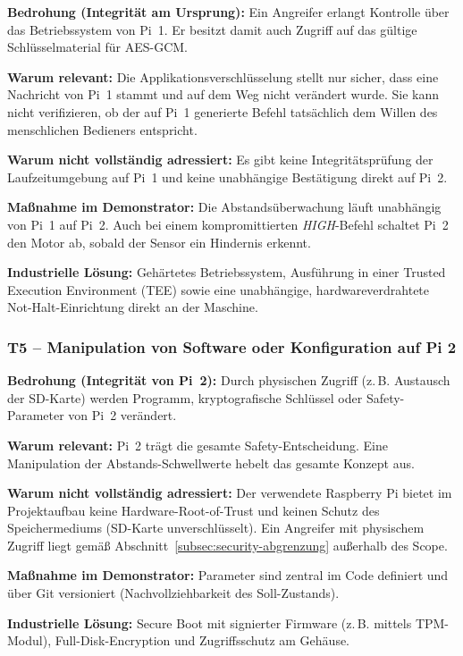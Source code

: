 \textbf{Bedrohung (Integrität am Ursprung):} Ein Angreifer erlangt Kontrolle
über das Betriebssystem von Pi~1. Er besitzt damit auch Zugriff auf das
gültige Schlüsselmaterial für AES-GCM.

\textbf{Warum relevant:} Die Applikationsverschlüsselung stellt nur sicher,
dass eine Nachricht von Pi~1 stammt und auf dem Weg nicht verändert wurde. Sie
kann nicht verifizieren, ob der auf Pi~1 generierte Befehl tatsächlich dem
Willen des menschlichen Bedieners entspricht.

\textbf{Warum nicht vollständig adressiert:} Es gibt keine Integritätsprüfung
der Laufzeitumgebung auf Pi~1 und keine unabhängige Bestätigung direkt auf Pi~2.

\textbf{Maßnahme im Demonstrator:} Die Abstandsüberwachung läuft unabhängig
von Pi~1 auf Pi~2. Auch bei einem kompromittierten \textit{HIGH}-Befehl schaltet Pi~2
den Motor ab, sobald der Sensor ein Hindernis erkennt.

\textbf{Industrielle Lösung:} Gehärtetes Betriebssystem, Ausführung in
einer Trusted Execution Environment (TEE) sowie eine unabhängige,
hardwareverdrahtete Not-Halt-Einrichtung direkt an der Maschine.

\subsubsection*{T5 -- Manipulation von Software oder Konfiguration auf Pi 2}

\textbf{Bedrohung (Integrität von Pi~2):} Durch physischen Zugriff
(z.\,B. Austausch der SD-Karte) werden Programm, kryptografische Schlüssel oder
Safety-Parameter von Pi~2 verändert.

\textbf{Warum relevant:} Pi~2 trägt die gesamte Safety-Entscheidung. Eine
Manipulation der Abstands-Schwellwerte hebelt das gesamte Konzept aus.

\textbf{Warum nicht vollständig adressiert:} Der verwendete Raspberry Pi
bietet im Projektaufbau keine Hardware-Root-of-Trust und keinen Schutz
des Speichermediums (SD-Karte unverschlüsselt). Ein Angreifer mit physischem
Zugriff liegt gemäß Abschnitt~\ref{subsec:security-abgrenzung} außerhalb des
Scope.

\textbf{Maßnahme im Demonstrator:} Parameter sind zentral im Code definiert
und über Git versioniert (Nachvollziehbarkeit des Soll-Zustands).

\textbf{Industrielle Lösung:} Secure Boot mit signierter Firmware (z.\,B.
mittels TPM-Modul), Full-Disk-Encryption und Zugriffsschutz am Gehäuse.

